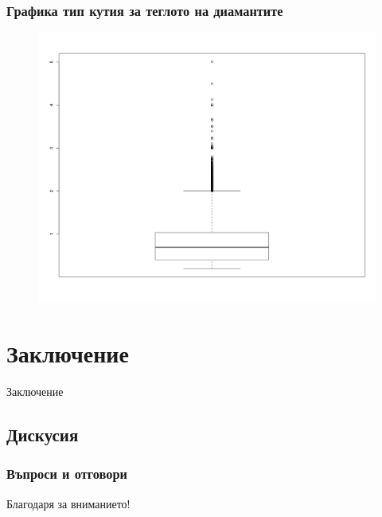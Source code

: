 \documentclass{beamer}
\begin{document}
\begin{frame}
\frametitle{Графика тип кутия за теглото на диамантите}
\begin{figure}[]\includegraphics[width=\textwidth,height=0.75\textheight]{pic0024}\end{figure}
\end{frame}

\section{Заключение}

\begin{frame}
\center \huge{Заключение}
\end{frame}

\subsection{Дискусия}

\begin{frame}
\frametitle{Въпроси и отговори}
\center \huge{Благодаря за вниманието!}
\end{frame}
\end{document}
